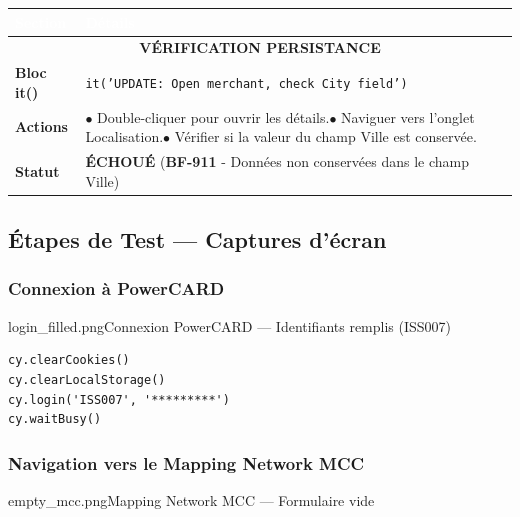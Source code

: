 \vspace{0.5cm}
\noindent
\begin{minipage}{\textwidth}
\renewcommand{\arraystretch}{1.5}
\begin{tabular}{|p{3cm}|p{12.5cm}|}
\hline
\rowcolor{primary}
\textcolor{white}{\textbf{Section}} & \textcolor{white}{\textbf{Détails}} \\
\hline
\multicolumn{2}{|c|}{\cellcolor{gray!20}\textbf{VÉRIFICATION PERSISTANCE}} \\
\hline
\textbf{Bloc it()} & \texttt{it('UPDATE: Open merchant, check City field')} \\
\hline
\textbf{Actions} & $\bullet$ Double-cliquer pour ouvrir les détails.\newline $\bullet$ Naviguer vers l'onglet Localisation.\newline $\bullet$ Vérifier si la valeur du champ Ville est conservée. \\
\hline
\textbf{Statut} & \textcolor{danger}{\textbf{ÉCHOUÉ}} (\textbf{BF-911} - Données non conservées dans le champ Ville) \\
\hline
\end{tabular}
\end{minipage}


\newpage
\subsection{Étapes de Test --- Captures d'écran}

\subsubsection{Connexion à PowerCARD}

          {login_filled.png}{Connexion PowerCARD --- Identifiants remplis (ISS007)}

\begin{lstlisting}[caption={Code de connexion}]
cy.clearCookies()
cy.clearLocalStorage()
cy.login('ISS007', '*********')
cy.waitBusy()
\end{lstlisting}

\subsubsection{Navigation vers le Mapping Network MCC}

          {empty_mcc.png}{Mapping Network MCC --- Formulaire vide}

